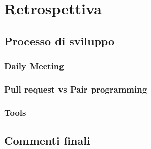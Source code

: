 
\newpage
\section{Retrospettiva}

\subsection{Processo di sviluppo}
\subsubsection{Daily Meeting}

\subsubsection{Pull request vs Pair programming}

\subsubsection{Tools}

\subsection{Commenti finali}
